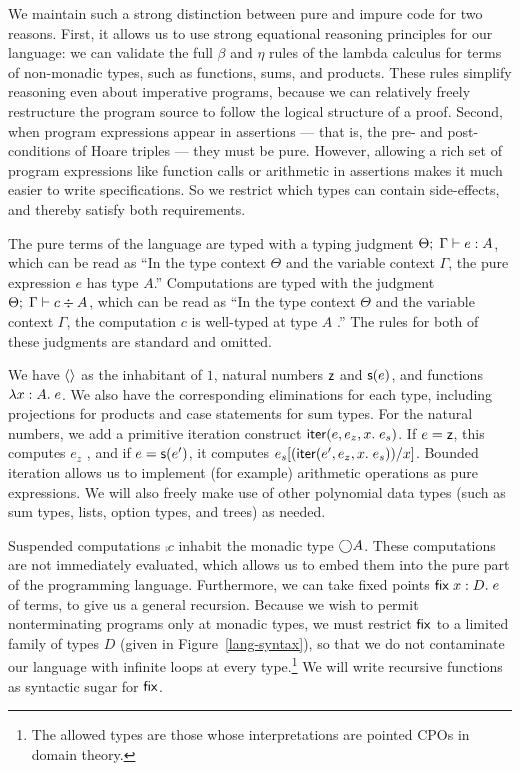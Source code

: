 \documentclass[natbib]{sigplanconf}
\begin{document}
We maintain such a strong distinction between pure and impure code for
two reasons. First, it allows us to use strong equational reasoning
principles for our language: we can validate the full $\beta$ and
$\eta$ rules of the lambda calculus for terms of non-monadic types,
such as functions, sums, and products. These rules simplify reasoning
even about imperative programs, because we can relatively freely
restructure the program source to follow the logical structure of a
proof. Second, when program expressions appear in assertions --- that
is, the pre- and post-conditions of Hoare triples --- they must be
pure. However, allowing a rich set of program expressions like
function calls or arithmetic in assertions makes it much easier to
write specifications. So we restrict which types can contain
side-effects, and thereby satisfy both requirements.

The pure terms of the language are typed with a typing judgment
${\Theta};\;{\Gamma} \vdash {e} : {A}$, which can be read as ``In the type context
$\Theta$ and the variable context $\Gamma$, the pure expression $e$
has type $A$.'' Computations are typed with the judgment
${\Theta};\;{\Gamma} \vdash {c} \div {A}$, which can be read as ``In the type context
$\Theta$ and the variable context $\Gamma$, the computation $c$ is
well-typed at type $A$ .'' The rules for both of these judgments are
standard and omitted.

We have $\left<\right>$ as the inhabitant of $1$, natural numbers $\mbox{\textsf{{z}}}$ and
$\mbox{\textsf{{s}}}(e)$, and functions $\lambda x:A.\;e$. We also have the corresponding
eliminations for each type, including projections for products and
case statements for sum types. For the natural numbers, we add a
primitive iteration construct $\mbox{\textsf{{iter}}}(e, {e_z}, {x}.\; {e_s})$. If $e = \mbox{\textsf{{z}}}$,
this computes $e_z$ , and if $e = \mbox{\textsf{{s}}}(e')$, it computes
$e_s[(\mbox{\textsf{{iter}}}(e', {e_z}, {x}.\; {e_s}))/x]$. Bounded iteration allows us
to implement (for example) arithmetic operations as pure expressions.
We will also freely make use of other polynomial data types (such as
sum types, lists, option types, and trees) as needed. 

Suspended computations $\comp{c}$ inhabit the monadic type
$\bigcirc{A}$.  These computations are not immediately evaluated, which
allows us to embed them into the pure part of the programming
language. Furthermore, we can take fixed points $\mbox{\textsf{{fix}}}\;{x:D}.\;{e}$ of
terms, to give us a general recursion. Because we wish to permit
nonterminating programs only at monadic types, we must restrict
$\mbox{\textsf{{fix}}}$ to a limited family of types $D$ (given in
Figure~\ref{lang-syntax}), so that we do not contaminate our language
with infinite loops at every type.\footnote{The allowed types are those whose
interpretations are pointed CPOs in domain theory.}  We will
write recursive functions as syntactic sugar for $\mbox{\textsf{{fix}}}$.
\end{document}
